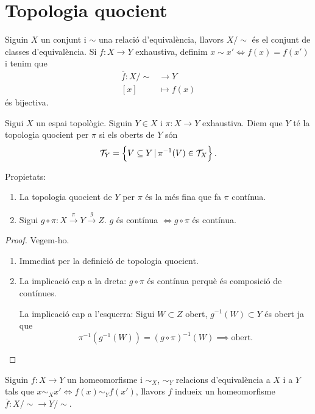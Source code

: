 \section{Topologia quocient}
\begin{obs}
    Siguin $X$ un conjunt i $\sim$ una relació d'equivalència, llavors $X/\sim$ \'es el conjunt de classes d'equivalència. Si $f\colon X\rightarrow Y$ exhaustiva, definim $x\sim x' \iff f(x) = f(x')$ i tenim que
    \begin{align*}
        \overline{f} \colon X/\sim &\rightarrow Y \\
        \left[ x \right] &\mapsto f(x)
    \end{align*}
    \'es bijectiva.
\end{obs}
\begin{defi}
    Sigui $X$ un espai topològic. Siguin $Y\in X$ i $\pi \colon X \rightarrow Y$ exhaustiva. Diem que $Y$ t\'e la topologia quocient per $\pi$ si els oberts de $Y$ són
    \[ \mathcal{T}_Y = \left\{ V\subseteq Y\,|\,\pi^{-1}(V) \in \mathcal{T}_X \right\}. \]
\end{defi}
\begin{prop}
    Propietats:
    \begin{enumerate}
        \item La topologia quocient de $Y$ per $\pi$ \'es la m\'es fina que fa $\pi$ contínua.
        \item Sigui $g\circ\pi \colon X \stackrel{\pi}{\rightarrow} Y \stackrel{g}{\rightarrow} Z$. $g$ \'es contínua $\iff g\circ\pi$ \'es contínua.
    \end{enumerate}
\end{prop}
\begin{proof}
    Vegem-ho.
    \begin{enumerate}
        \item Immediat per la definició de topologia quocient.
        \item La implicació cap a la dreta: $g \circ \pi$ \'es contínua perquè \'es composició de contínues.

            La implicació cap a l'esquerra: Sigui $W \subset Z$ obert, $g^{-1}(W) \subset Y$ \'es obert ja que
            \[\pi^{-1}\left( g^{-1}\left( W \right) \right) = \left( g\circ \pi \right)^{-1}\left( W \right) \implies \text{obert.}\]
    \end{enumerate}
\end{proof}
\begin{prop}
    Siguin $f\colon X\rightarrow Y$ un homeomorfisme i $\sim_X$, $\sim_Y$ relacions d'equivalència a $X$ i a $Y$ tals que $x \sim_X x' \iff f\left( x \right) \sim_Y f\left( x' \right)$, llavors $f$ indueix un homeomorfisme $\overline{f} \colon X/\sim \rightarrow Y/\sim$.
\end{prop}
